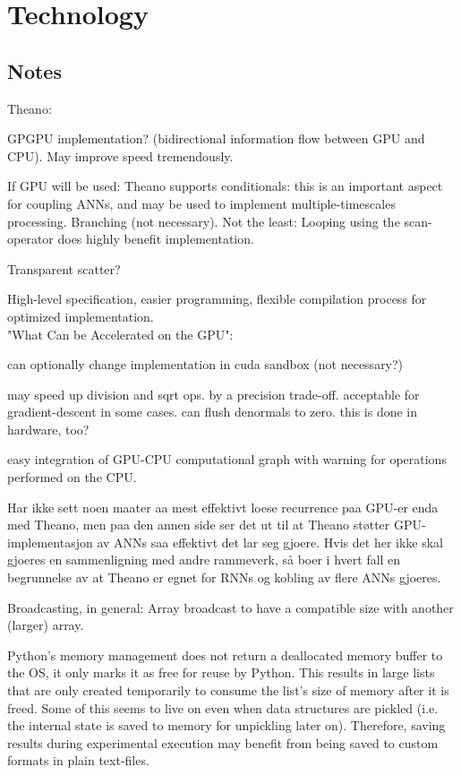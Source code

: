 
\chapter{Technology}\label{chpt:tech}
\section{Notes}

Theano:

GPGPU implementation? (bidirectional information flow between GPU and CPU). May improve speed tremendously.

If GPU will be used: Theano supports conditionals: this is an important aspect for coupling ANNs, and may be used to implement multiple-timescales processing.
Branching (not necessary). Not the least: Looping using the scan-operator does highly benefit implementation.

Transparent scatter?

High-level specification, easier programming, flexible compilation process for optimized implementation.
\\

"What Can be Accelerated on the GPU":

can optionally change implementation in cuda sandbox (not necessary?)

may speed up division and sqrt ops. by a precision trade-off. acceptable for gradient-descent in some cases.
can flush denormals to zero. this is done in hardware, too?

easy integration of GPU-CPU computational graph with warning for operations performed on the CPU.

Har ikke sett noen maater aa mest effektivt loese recurrence paa GPU-er enda med Theano, men paa den annen side ser det ut til at Theano støtter GPU-implementasjon av ANNs saa effektivt det lar seg gjoere. Hvis det her ikke skal gjoeres en sammenligning med andre rammeverk, så boer i hvert fall en begrunnelse av at Theano er egnet for RNNs og kobling av flere ANNs gjoeres.

Broadcasting, in general: Array broadcast to have a compatible size with another (larger) array.

Python's memory management does not return a deallocated memory buffer to the OS, it only marks it as free for reuse by Python. This results in large lists that are only created temporarily to consume the list's size of memory after it is freed. Some of this seems to live on even when data structures are pickled (i.e. the internal state is saved to memory for unpickling later on). Therefore, saving results during experimental execution may benefit from being saved to custom formats in plain text-files.

